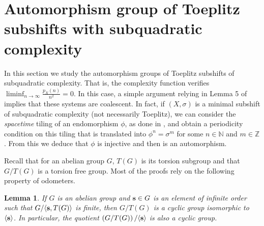 \documentclass{daj}
\theoremstyle{plain}
\newtheorem{lemma}[theorem]{Lemma}
\theoremstyle{definition}
\begin{document}
\section{Automorphism group of Toeplitz subshifts with subquadratic complexity}
\label{Sec:ToeplitzSubquadratic}

In this section we study the automorphism groups of Toeplitz subshifts of subquadratic complexity. That is, the complexity function verifies $\displaystyle \liminf_{n\to \infty}\frac{p_X(n)}{n^2}=0$. In this case, a simple argument relying in  Lemma 5 of \cite{QZ} implies that these systems are coalescent. In fact, if $(X,\sigma)$ is a minimal subshift of subquadratic complexity (not necessarily Toeplitz), we can consider the {\em spacetime} tiling of an endomorphism $\phi$, as done in \cite{CyrKra, CyrKra4,CyrKra5}, 
and obtain a periodicity condition on this tiling that is translated into $\phi^n=\sigma^m$ for some $n\in \mathbb{N}$ and $m\in \mathbb{Z}$. From this we deduce that $\phi$ is injective and then is an automorphism. 

Recall that for an abelian group $G$, $T(G)$ is its torsion subgroup and that $G/T(G)$ is a torsion free group. Most of the proofs rely on the following property of odometers.


\begin{lemma}\label{lem:Algebre} If $G$ is an abelian group and ${\bf s} \in G$ is an element of infinite order  
	such that $G/\langle {\bf s}, T(G) \rangle$ is finite, then $G/T(G)$ is a cyclic group isomorphic to $\langle {\bf s} \rangle$. In particular, the quotient  $\left(G/T(G) \right)/\langle {\bf s} \rangle$ is also a cyclic group. 
\end{lemma}
\end{document}
